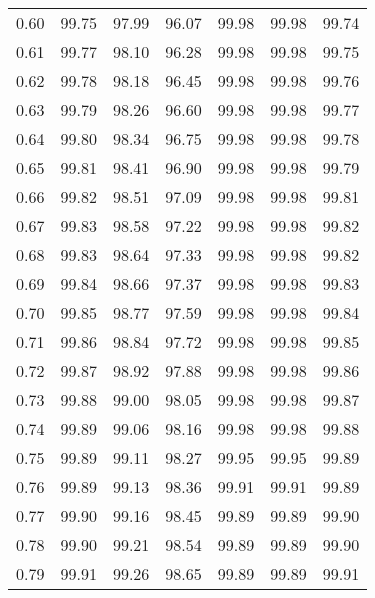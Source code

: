\begin{tabular}{|c|c|c|c|c|c|c|}
      0.60 &     99.75 &     97.99 &      96.07 &   99.98 &      99.98 &         99.74 \\
      0.61 &     99.77 &     98.10 &      96.28 &   99.98 &      99.98 &         99.75 \\
      0.62 &     99.78 &     98.18 &      96.45 &   99.98 &      99.98 &         99.76 \\
      0.63 &     99.79 &     98.26 &      96.60 &   99.98 &      99.98 &         99.77 \\
      0.64 &     99.80 &     98.34 &      96.75 &   99.98 &      99.98 &         99.78 \\
      0.65 &     99.81 &     98.41 &      96.90 &   99.98 &      99.98 &         99.79 \\
      0.66 &     99.82 &     98.51 &      97.09 &   99.98 &      99.98 &         99.81 \\
      0.67 &     99.83 &     98.58 &      97.22 &   99.98 &      99.98 &         99.82 \\
      0.68 &     99.83 &     98.64 &      97.33 &   99.98 &      99.98 &         99.82 \\
      0.69 &     99.84 &     98.66 &      97.37 &   99.98 &      99.98 &         99.83 \\
      0.70 &     99.85 &     98.77 &      97.59 &   99.98 &      99.98 &         99.84 \\
      0.71 &     99.86 &     98.84 &      97.72 &   99.98 &      99.98 &         99.85 \\
      0.72 &     99.87 &     98.92 &      97.88 &   99.98 &      99.98 &         99.86 \\
      0.73 &     99.88 &     99.00 &      98.05 &   99.98 &      99.98 &         99.87 \\
      0.74 &     99.89 &     99.06 &      98.16 &   99.98 &      99.98 &         99.88 \\
      0.75 &     99.89 &     99.11 &      98.27 &   99.95 &      99.95 &         99.89 \\
      0.76 &     99.89 &     99.13 &      98.36 &   99.91 &      99.91 &         99.89 \\
      0.77 &     99.90 &     99.16 &      98.45 &   99.89 &      99.89 &         99.90 \\
      0.78 &     99.90 &     99.21 &      98.54 &   99.89 &      99.89 &         99.90 \\
      0.79 &     99.91 &     99.26 &      98.65 &   99.89 &      99.89 &         99.91 \\

\end{tabular}

